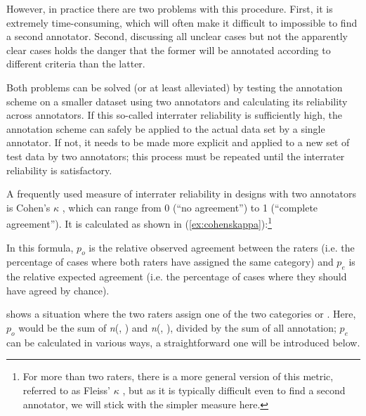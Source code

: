 However, in practice there are two problems with this procedure. First, it is extremely time\hyp{}consuming, which will often make it difficult to impossible to find a second annotator.  Second, discussing all unclear cases but not the apparently clear cases holds the danger that the former will be annotated according to different criteria than the latter.

Both problems can be solved (or at least alleviated) by testing the annotation  scheme on a smaller dataset using two annotators and calculating its reliability  across annotators. If this so\hyp{}called interrater  reliability is sufficiently high, the annotation scheme can safely be applied to the actual data set by a single annotator. If not, it needs to be made more explicit and applied to a new set of test data by two annotators; this process must be repeated until the interrater reliability is satisfactory.

A frequently used measure of interrater  reliability in designs  with two annotators  is Cohen's $\kappa$ \citep{cohen_coefficient_1960}, which can range from 0 (``no agreement'') to 1 (``complete agreement''). It is calculated as shown in (\ref{ex:cohenskappa}):\footnote{For more than two raters, there is a more general version of this metric, referred to as Fleiss' $\kappa$ \citep{fleiss_measuring_1971}, but as it is typically difficult even to find a second annotator,  we will stick with the simpler measure here.}

\begin{exe}
\ex {}
\end{exe}

In this formula, $p_o$ is the relative observed agreement between the raters (i.e. the percentage of cases where both raters have assigned the same category) and $p_e$ is the relative expected agreement (i.e. the percentage of cases where they should have agreed by  chance).

 shows a situation where the two raters assign one of the two categories   or . Here, $p_o$ would be the sum of \textit{n}(, ) and \textit{n}(, ), divided by the sum of all annotation;  $p_e$ can be calculated in various ways, a straightforward one will be introduced below.

